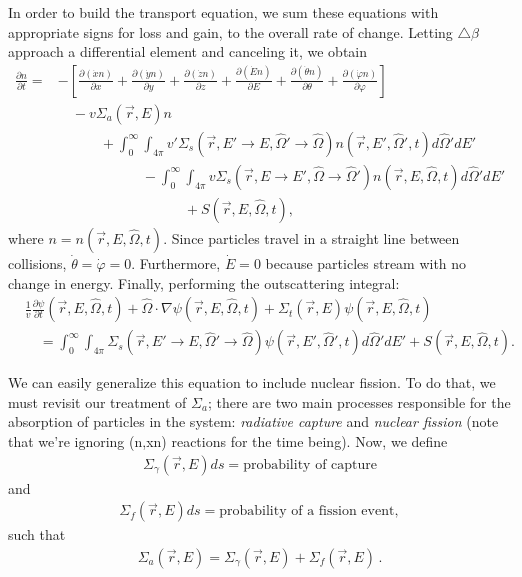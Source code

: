 \documentclass[12pt]{article}
\newcommand{\rvec}{\ensuremath{\vec{r}}}
\newcommand{\omvec}{\ensuremath{\hat{\Omega}}}
\begin{document}
 In order to build the transport equation, we sum these equations with appropriate signs
for loss and gain, to the overall rate of change. Letting $\triangle \beta$ approach a differential
element and canceling it, we obtain
\begin{align}
\frac{\partial n}{\partial t} =& -\left[\frac{\partial (\dot x n)}{\partial x} +
\frac{\partial (\dot y n)}{\partial y}+\frac{\partial (\dot z n)}{\partial z} +
\frac{\partial (\dot E n)}{\partial E}+\frac{\partial (\dot \theta n)}{\partial \theta}+
\frac{\partial (\dot \varphi n)}{\partial \varphi}\right] 
\\ & \quad - v\Sigma_a(\rvec,E)n \nonumber
 \\& \quad\quad\quad   + 
\int_0^{\infty}\int_{4\pi}v'\Sigma_s(\rvec, E'\rightarrow E,\omvec'\rightarrow\omvec)n(\rvec,E',\omvec',t) d\omvec'dE'\nonumber 
\\& \quad\quad\quad\quad\quad\quad -\int_0^{\infty}\int_{4\pi}v\Sigma_s(\rvec, E\rightarrow E',\omvec\rightarrow\omvec')n(\rvec,E,\omvec,t) d\omvec'dE'\nonumber
\\& \quad\quad\quad\quad\quad\quad\quad\quad\quad
+S(\rvec,E,\omvec,t),\nonumber
\end{align}
 where $n = n(\rvec,E,\omvec,t)$. Since particles travel in a straight line
between collisions, \linebreak
$\dot \theta = \dot \varphi = 0$. Furthermore, $\dot E = 0$ because particles stream
with no change in energy. Finally, performing the outscattering integral:
\begin{align}
&\frac{1}{v}\frac{\partial \psi}{\partial t}(\rvec,E,\omvec,t) + \omvec\cdot  \nabla \psi(\rvec,E,\omvec,t) +
 \Sigma_t(\rvec,E)\psi(\rvec,E,\omvec,t)
\\& \quad =
\int_0^{\infty}\int_{4\pi}\Sigma_s(\rvec, E'\rightarrow E,\omvec'\rightarrow\omvec)
\psi(\rvec,E',\omvec',t)d\omvec'dE'+S(\rvec, E, \omvec,t) \nonumber.
\end{align}

We can easily generalize this equation to include nuclear fission.
To do that, we must revisit our treatment of $\Sigma_a$; there are two main processes responsible for the absorption of particles in the system: \textit{radiative capture} and \textit{nuclear fission} (note that we're ignoring (n,xn) reactions for the time being). Now, we define
\begin{align*}
\Sigma_\gamma(\rvec,E)ds = \textrm{probability of capture}
\end{align*}
and
\begin{align*}
\Sigma_f(\rvec,E)ds = \textrm{probability of a fission event},
\end{align*}
such that
\begin{align*}
\Sigma_a(\rvec,E) = \Sigma_\gamma(\rvec,E) + \Sigma_f(\rvec,E)\,.
\end{align*}
\end{document}
